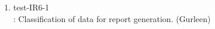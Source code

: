 \documentclass[12pt, titlepage]{article}
\begin{document}
\begin{enumerate}
    \item{test-IR6-1\\}: Classification of data for report generation. (Gurleen) \label{test-IR6-1}
    
    
    
    
    

    
    
    
    
    

\end{enumerate}

\newpage
\end{document}
